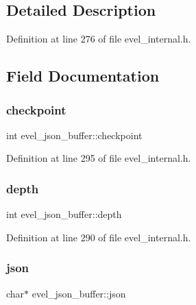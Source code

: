\subsection{Detailed Description}


Definition at line 276 of file evel\+\_\+internal.\+h.



\subsection{Field Documentation}
\hypertarget{structevel__json__buffer_ac1e8cd1cc09c857b6a69e07a5dade344}{}\label{structevel__json__buffer_ac1e8cd1cc09c857b6a69e07a5dade344} 
\subsubsection{\texorpdfstring{checkpoint}{checkpoint}}
{\footnotesize\ttfamily int evel\+\_\+json\+\_\+buffer\+::checkpoint}



Definition at line 295 of file evel\+\_\+internal.\+h.

\hypertarget{structevel__json__buffer_a0710f8e8c62797e2151a68e3543ac81e}{}\label{structevel__json__buffer_a0710f8e8c62797e2151a68e3543ac81e} 
\subsubsection{\texorpdfstring{depth}{depth}}
{\footnotesize\ttfamily int evel\+\_\+json\+\_\+buffer\+::depth}



Definition at line 290 of file evel\+\_\+internal.\+h.

\hypertarget{structevel__json__buffer_a04cb4f4f3ea9f7bf73a08c128c4608b1}{}\label{structevel__json__buffer_a04cb4f4f3ea9f7bf73a08c128c4608b1} 
\subsubsection{\texorpdfstring{json}{json}}
{\footnotesize\ttfamily char$\ast$ evel\+\_\+json\+\_\+buffer\+::json}



